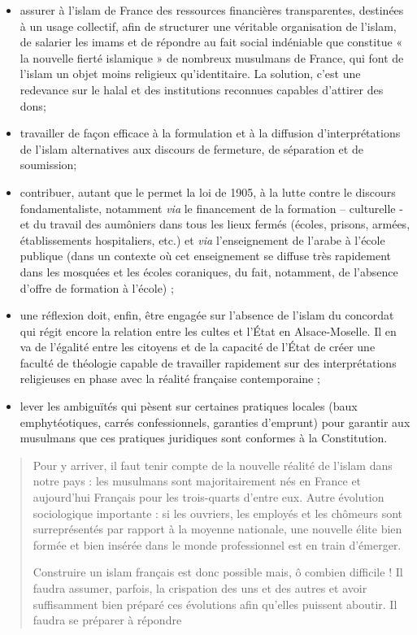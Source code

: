 \begin{itemize}
\item
  assurer à l'islam de France des ressources financières transparentes,
  destinées à un usage collectif, afin de structurer une véritable
  organisation de l'islam, de salarier les imams et de répondre au fait
  social indéniable que constitue « la nouvelle fierté islamique » de
  nombreux musulmans de France, qui font de l'islam un objet moins
  religieux qu'identitaire. La solution, c'est une redevance sur le
  halal et des institutions reconnues capables d'attirer des dons;
\item
  travailler de façon efficace à la formulation et à la diffusion
  d'interprétations de l'islam alternatives aux discours de fermeture,
  de séparation et de soumission;
\item
  contribuer, autant que le permet la loi de 1905, à la lutte contre le
  discours fondamentaliste, notamment \emph{via} le financement de la
  formation -- culturelle - et du travail des aumôniers dans tous les
  lieux fermés (écoles, prisons, armées, établissements hospitaliers,
  etc.) et \emph{via} l'enseignement de l'arabe à l'école publique (dans
  un contexte où cet enseignement se diffuse très rapidement dans les
  mosquées et les écoles coraniques, du fait, notamment, de l'absence
  d'offre de formation à l'école) ;
\item
  une réflexion doit, enfin, être engagée sur l'absence de l'islam du
  concordat qui régit encore la relation entre les cultes et l'État en
  Alsace-Moselle. Il en va de l'égalité entre les citoyens et de la
  capacité de l'État de créer une faculté de théologie capable de
  travailler rapidement sur des interprétations religieuses en phase
  avec la réalité française contemporaine ;
\item
  lever les ambiguïtés qui pèsent sur certaines pratiques locales (baux
  emphytéotiques, carrés confessionnels, garanties d'emprunt) pour
  garantir aux musulmans que ces pratiques juridiques sont conformes à
  la Constitution.
\end{itemize}

\begin{quote}
Pour y arriver, il faut tenir compte de la nouvelle réalité de l'islam
dans notre pays : les musulmans sont majoritairement nés en France et
aujourd'hui Français pour les trois-quarts d'entre eux. Autre évolution
sociologique importante : si les ouvriers, les employés et les chômeurs
sont surreprésentés par rapport à la moyenne nationale, une nouvelle
élite bien formée et bien insérée dans le monde professionnel est en
train d'émerger.

Construire un islam français est donc possible mais, ô combien difficile
! Il faudra assumer, parfois, la crispation des uns et des autres et
avoir suffisamment bien préparé ces évolutions afin qu'elles puissent
aboutir. Il faudra se préparer à répondre
\end{quote}


